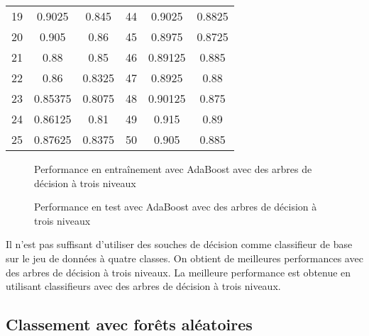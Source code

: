 \documentclass[french, twoside=semi, headings=normal]{scrartcl}
\begin{document}
\begin{table}
\begin{tabular}{S S S S S S}
			19 & 0.9025 & 0.845 & 44 & 0.9025 & 0.8825 \\
			20 & 0.905 & 0.86 & 45 & 0.8975 & 0.8725 \\
			21 & 0.88 & 0.85 & 46 & 0.89125 & 0.885 \\
			22 & 0.86 & 0.8325 & 47 & 0.8925 & 0.88 \\
			23 & 0.85375 & 0.8075 & 48 & 0.90125 & 0.875 \\
			24 & 0.86125 & 0.81 & 49 & 0.915 & 0.89 \\
			25 & 0.87625 & 0.8375 & 50 & 0.905 & 0.885 \\
		\bottomrule
	\end{tabular}
	\label{tab:adaboost_scores_with_decision_trees}
\end{table}
\begin{figure}
	\centering
	
	\caption{Performance en entraînement avec AdaBoost avec des arbres de décision à trois niveaux}
	\label{fig:adaboost_train_scores_with_decision_trees}
\end{figure}
\begin{figure}
	\centering
	
	\caption{Performance en test avec AdaBoost avec des arbres de décision à trois niveaux}
	\label{fig:adaboost_test_scores_with_decision_trees}
\end{figure}

Il n'est pas suffisant d'utiliser des souches de décision comme classifieur de base sur le jeu de données à quatre classes. On obtient de meilleures performances avec des arbres de décision à trois niveaux. La meilleure performance est obtenue en utilisant  classifieurs avec des arbres de décision à trois niveaux.

\subsection{Classement avec forêts aléatoires}
\end{document}
